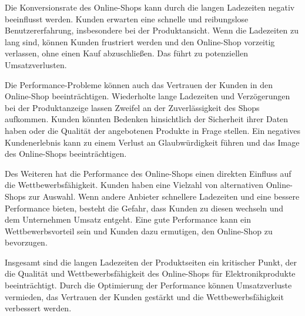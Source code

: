 Die Konversionsrate des Online-Shops kann durch die langen Ladezeiten negativ beeinflusst werden. Kunden erwarten eine schnelle und reibungslose Benutzererfahrung, insbesondere bei der Produktansicht. Wenn die Ladezeiten zu lang sind, können Kunden frustriert werden und den Online-Shop vorzeitig verlassen, ohne einen Kauf abzuschließen. Das führt zu potenziellen Umsatzverlusten.

Die Performance-Probleme können auch das Vertrauen der Kunden in den Online-Shop beeinträchtigen. Wiederholte lange Ladezeiten und Verzögerungen bei der Produktanzeige lassen Zweifel an der Zuverlässigkeit des Shops aufkommen. Kunden könnten Bedenken hinsichtlich der Sicherheit ihrer Daten haben oder die Qualität der angebotenen Produkte in Frage stellen. Ein negatives Kundenerlebnis kann zu einem Verlust an Glaubwürdigkeit führen und das Image des Online-Shops beeinträchtigen.

Des Weiteren hat die Performance des Online-Shops einen direkten Einfluss auf die Wettbewerbsfähigkeit. Kunden haben eine Vielzahl von alternativen Online-Shops zur Auswahl. Wenn andere Anbieter schnellere Ladezeiten und eine bessere Performance bieten, besteht die Gefahr, dass Kunden zu diesen wechseln und dem Unternehmen Umsatz entgeht. Eine gute Performance kann ein Wettbewerbsvorteil sein und Kunden dazu ermutigen, den Online-Shop zu bevorzugen.

Insgesamt sind die langen Ladezeiten der Produktseiten ein kritischer Punkt, der die Qualität und Wettbewerbsfähigkeit des Online-Shops für Elektronikprodukte beeinträchtigt. Durch die Optimierung der Performance können Umsatzverluste vermieden, das Vertrauen der Kunden gestärkt und die Wettbewerbsfähigkeit verbessert werden.